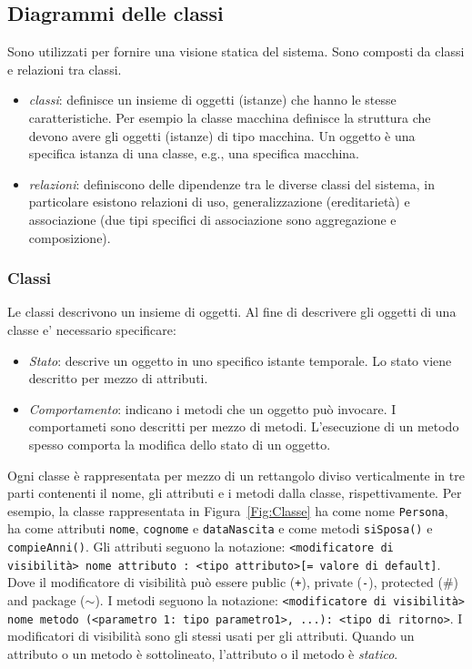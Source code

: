 \documentclass{article}
\begin{document}
\subsection{Diagrammi delle classi}
Sono utilizzati per fornire una visione statica del sistema. Sono composti da classi e relazioni tra classi.
\begin{itemize}
\item \emph{classi}: definisce un insieme di oggetti (istanze) che hanno le stesse caratteristiche. Per esempio la classe macchina definisce la struttura che devono avere gli oggetti (istanze) di tipo macchina. Un oggetto \`e una specifica istanza di una classe, e.g., una specifica macchina.
\item \emph{relazioni}: definiscono delle dipendenze tra le diverse classi del sistema, in particolare esistono relazioni di uso, generalizzazione (ereditariet\`a) e associazione (due tipi specifici di associazione sono aggregazione e composizione).
\end{itemize}

\subsubsection{Classi}
Le classi descrivono un insieme di oggetti. Al fine di descrivere gli oggetti di una classe e' necessario specificare:
\begin{itemize}
\item \emph{Stato}: descrive un oggetto in uno specifico istante temporale. Lo stato viene descritto per mezzo di attributi.
\item \emph{Comportamento}: indicano i metodi che un oggetto pu\`o invocare. I comportameti sono descritti per mezzo di metodi. L'esecuzione di un metodo spesso comporta la modifica dello stato di un oggetto.
\end{itemize}
Ogni classe \`e rappresentata per mezzo di un rettangolo diviso verticalmente in tre parti contenenti il nome, gli attributi e
 i metodi dalla classe, rispettivamente.  
 Per esempio, la classe rappresentata in Figura~\ref{Fig:Classe} ha come nome \texttt{Persona}, ha come attributi \texttt{nome}, \texttt{cognome} e \texttt{dataNascita} e come metodi \texttt{siSposa()} e \texttt{compieAnni()}. Gli attributi seguono la notazione: \texttt{<modificatore di visibilit\`a> nome attributo : <tipo attributo>[= valore di default]}. 
Dove il modificatore di visibilit\`a pu\`o essere public (\texttt{+}), private (\texttt{-}), protected ($\#$) and package ($\sim$).
 I metodi seguono la notazione: \texttt{<modificatore di visibilit\`a> nome metodo (<parametro 1: tipo parametro1>, ...): <tipo di ritorno>}.
I modificatori di visibilit\`a sono gli stessi usati per gli attributi. 
Quando un attributo o un metodo \`e sottolineato, l'attributo o il metodo \`e \emph{statico}.
 
\end{document}

